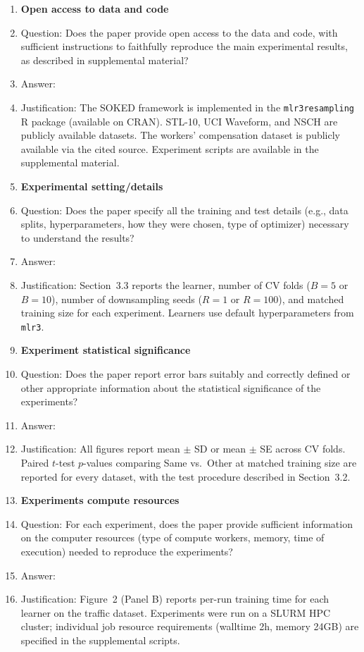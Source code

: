 \begin{enumerate}
\item {\bf Open access to data and code}
    \item[] Question: Does the paper provide open access to the data and code, with sufficient instructions to faithfully reproduce the main experimental results, as described in supplemental material?
    \item[] Answer: \answerYes{}
    \item[] Justification: The SOKED framework is implemented in the \texttt{mlr3resampling} R package (available on CRAN). STL-10, UCI Waveform, and NSCH are publicly available datasets. The workers' compensation dataset is publicly available via the cited source. Experiment scripts are available in the supplemental material.

\item {\bf Experimental setting/details}
    \item[] Question: Does the paper specify all the training and test details (e.g., data splits, hyperparameters, how they were chosen, type of optimizer) necessary to understand the results?
    \item[] Answer: \answerYes{}
    \item[] Justification: Section~3.3 reports the learner, number of CV folds ($B=5$ or $B=10$), number of downsampling seeds ($R=1$ or $R=100$), and matched training size for each experiment. Learners use default hyperparameters from \texttt{mlr3}.

\item {\bf Experiment statistical significance}
    \item[] Question: Does the paper report error bars suitably and correctly defined or other appropriate information about the statistical significance of the experiments?
    \item[] Answer: \answerYes{}
    \item[] Justification: All figures report mean $\pm$ SD or mean $\pm$ SE across CV folds. Paired $t$-test $p$-values comparing Same vs.\ Other at matched training size are reported for every dataset, with the test procedure described in Section~3.2.

\item {\bf Experiments compute resources}
    \item[] Question: For each experiment, does the paper provide sufficient information on the computer resources (type of compute workers, memory, time of execution) needed to reproduce the experiments?
    \item[] Answer: \answerYes{}
    \item[] Justification: Figure~2 (Panel B) reports per-run training time for each learner on the traffic dataset. Experiments were run on a SLURM HPC cluster; individual job resource requirements (walltime 2h, memory 24GB) are specified in the supplemental scripts.


\end{enumerate}
